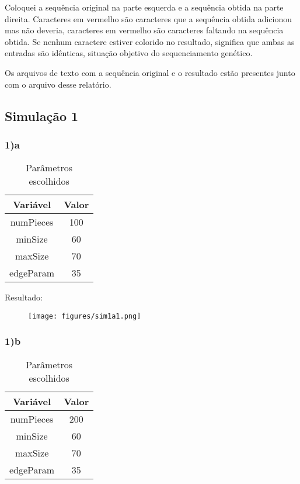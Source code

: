 \documentclass{article}
\begin{document}
\begin{multicols}{2}
Coloquei a sequência original na parte esquerda e a sequência obtida na parte direita. Caracteres em vermelho são caracteres que a sequência obtida adicionou mas não deveria, caracteres em vermelho são caracteres faltando na sequência obtida.
Se nenhum caractere estiver colorido no resultado, significa que ambas as entradas são idênticas, situação objetivo do sequenciamento genético.

Os arquivos de texto com a sequência original e o resultado estão presentes junto com o arquivo desse relatório.

\subsection{Simulação 1}

\subsubsection{1)a}
\begin{table}[H]
    \centering
    \caption{Parâmetros escolhidos}
    \begin{tabular}{| c | c |}
        \hline
        \textbf{Variável} & \textbf{Valor} \\
        \hline
        numPieces & 100 \\
        minSize & 60 \\
        maxSize & 70 \\
        edgeParam & 35 \\
        \hline
    \end{tabular}
\end{table}


Resultado: 
\begin{figure}[H]
    \centering
    \texttt{[image: figures/sim1a1.png]}
    \caption{}
    \label{sim1a1}
\end{figure}


\subsubsection{1)b}
\begin{table}[H]
    \centering
    \caption{Parâmetros escolhidos}
    \begin{tabular}{| c | c |}
        \hline
        \textbf{Variável} & \textbf{Valor} \\
        \hline
        numPieces & 200 \\
        minSize & 60 \\
        maxSize & 70 \\
        edgeParam & 35 \\
        \hline
    \end{tabular}
\end{table}


\end{multicols}
\end{document}
